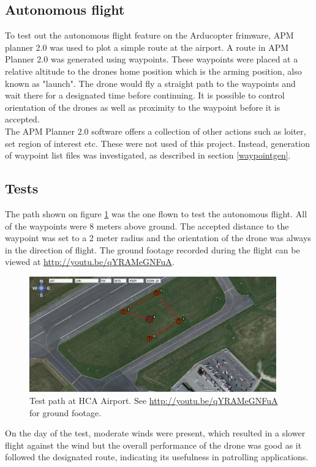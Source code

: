 \subsection{Autonomous flight}
To test out the autonomous flight feature on the Arducopter frimware, APM planner 2.0 was used to
plot a simple route at the airport. A route in APM Planner 2.0 was generated using waypoints.
These waypoints were placed at a relative altitude to the drones home position which is the arming
position, also known as "launch".
The drone would fly a straight path to the waypoints and wait there for a designated
time before continuing.
It is possible to control orientation of the drones as well as proximity to the waypoint
before it is accepted.\\
The APM Planner 2.0 software offers a collection of other actions such as loiter, set region of
interest etc. These were not used of this project.
Instead, generation of waypoint list files was investigated, as described in section \ref{waypointgen}.

\subsection{Tests}
The path shown on figure \ref{fig:HCAPath} was the one flown to test the autonomous flight.
All of the waypoints were 8 meters above ground. The accepted distance to the waypoint was set to a 2 meter
radius and the orientation of the drone was always in the direction of flight.
The ground footage recorded during the flight can be viewed at \url{http://youtu.be/qYRAMeGNFuA}.

\begin{figure}[H]
  \centering
    \includegraphics[width=0.95\textwidth]{./Images/HCAPath}
  \caption{Test path at HCA Airport. See \url{http://youtu.be/qYRAMeGNFuA} for ground footage.}
  \label{fig:HCAPath}
\end{figure}

On the day of the test, moderate winds were present, which resulted in a slower flight against the wind but the
overall performance of the drone was good as it followed the designated route,
indicating its usefulness in patrolling applications.

